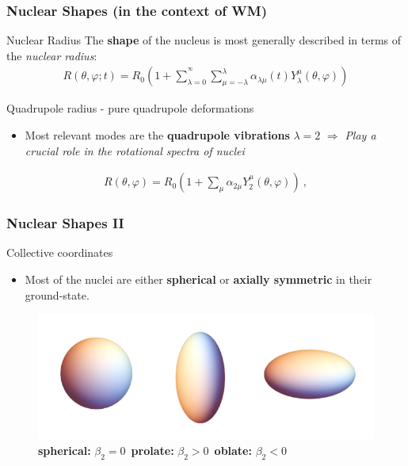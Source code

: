 \documentclass[
	11pt, %
]{beamer}
\begin{document}
\begin{frame}
	\frametitle{Nuclear Shapes (in the context of WM)}
	\begin{exampleblock}{Nuclear Radius}
		The \textbf{shape} of the nucleus is most generally described in terms of the \emph{nuclear radius}:
		\begin{align}
			R(\theta,\varphi;t)=R_0\left(1+\sum_{\lambda=0}^{^\infty}\sum_{\mu=-\lambda}^\lambda\alpha_{\lambda\mu}(t)Y_\lambda^\mu(\theta,\varphi)\right)
		\end{align}
	\end{exampleblock}
	\begin{block}{Quadrupole radius - pure quadrupole deformations}

		\begin{itemize}
			\item Most relevant modes are the \textbf{quadrupole vibrations} $\lambda=2$ $\Longrightarrow$ \emph{Play a crucial role in the rotational spectra of nuclei}
		\end{itemize}
		\begin{align}
			R(\theta,\varphi)=R_0\left(1+\sum_\mu\alpha_{2\mu}Y_2^\mu(\theta,\varphi)\right)\ ,
		\end{align}
	\end{block}
\end{frame}

\begin{frame}
	\frametitle{Nuclear Shapes II}
	\begin{block}{Collective coordinates}
		\begin{itemize}
			\item Most of the nuclei are either \textbf{spherical} or \textbf{axially symmetric} in their ground-state.
		\end{itemize}
	\end{block}
	\begin{figure}
		\centering
		\includegraphics[scale=0.38]{figures/nuclear_shapes.png}
		\caption{\textbf{spherical:} $\beta_2=0$\ \textbf{prolate:} $\beta_2>0$\ \textbf{oblate:} $\beta_2<0$}
	\end{figure}
\end{frame}
\end{document}
